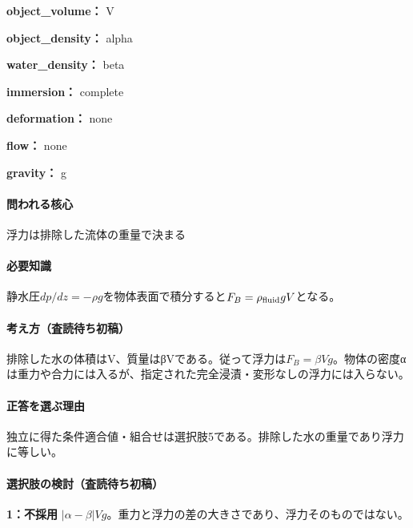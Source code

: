 \noindent\textbf{object\_volume：} V\par

\noindent\textbf{object\_density：} alpha\par

\noindent\textbf{water\_density：} beta\par

\noindent\textbf{immersion：} complete\par

\noindent\textbf{deformation：} none\par

\noindent\textbf{flow：} none\par

\noindent\textbf{gravity：} g\par

\paragraph{問われる核心} 浮力は排除した流体の重量で決まる

\paragraph{必要知識} 静水圧\(dp/dz=-\rho g\)を物体表面で積分すると\(F_B=\rho_{\rm fluid}gV\)となる。

\paragraph{考え方（査読待ち初稿）} 排除した水の体積はV、質量はβVである。従って浮力は\(F_B=\beta Vg\)。物体の密度αは重力や合力には入るが、指定された完全浸漬・変形なしの浮力には入らない。

\paragraph{正答を選ぶ理由} 独立に得た条件適合値・組合せは選択肢5である。排除した水の重量であり浮力に等しい。

\paragraph{選択肢の検討（査読待ち初稿）}\mbox{}\par

\noindent\textbf{1：不採用} \(|\alpha-\beta|Vg\)。重力と浮力の差の大きさであり、浮力そのものではない。\par


